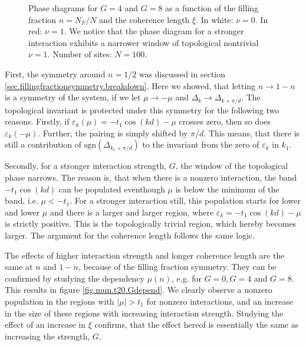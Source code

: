 \begin{figure}
\begin{center}

\caption{Phase diagrams for $G = 4$ and $G = 8$ as a function of the filling fraction $n = N_F/N$ and the coherence length $\xi$. In white: $\nu = 0$. In red: $\nu = 1$. We notice that the phase diagram for a stronger interaction exhibits a narrower window of topological nontrivial $\nu = 1$. Number of sites: $N = 100$. }
\label{fig.phasediagram.t20}
\end{center}
\end{figure}

First, the symmetry around $n = 1/2$ was discussed in section \ref{sec.fillingfractionsymmetry.breakdown}. Here we showed, that letting $n\to 1 - n$ is a symmetry of the system, if we let $\mu \to -\mu$ and $\Delta_{k} \to \Delta_{k + \pi/d}$. The topological invariant is protected under this symmetry for the following two reasons. Firstly, if $\varepsilon_k(\mu) = -t_1\cos(kd) - \mu$ crosses zero, then so does $\varepsilon_k(-\mu)$. Further, the pairing is simply shifted by $\pi / d$. This means, that there is still a contribution of $\text{sgn}(\Delta_{k_1+\pi/d})$ to the invariant from the zero of $\varepsilon_k$ in $k_1$.

Secondly, for a stronger interaction strength, $G$, the window of the topological phase narrows. The reason is, that when there is a nonzero interaction, the band $-t_1\cos(kd)$ can be populated eventhough $\mu$ is below the minimum of the band, i.e. $\mu < -t_1$. For a stronger interaction still, this population starts for lower and lower $\mu$ and there is a larger and larger region, where $\varepsilon_k = -t_1\cos(kd) - \mu$ is strictly positive. This is the topologically trivial region, which hereby becomes larger. The argument for the coherence length follows the same logic.

The effects of higher interaction strength and longer coherence length are the same at $n$ and $1 - n$, because of the filling fraction symmetry. They can be confirmed by studying the dependency $\mu(n)$, e.g. for $G = 0, G = 4$ and $G = 8$. This results in figure \ref{fig.mun.t20.Gdepend}. We clearly observe a nonzero population in the regions with $|\mu| > t_1$ for nonzero interactions, and an increase in the size of these regions with increasing interaction strength. Studying the effect of an increase in $\xi$ confirms, that the effect hereof is essentially the same as increasing the strength, $G$.  

